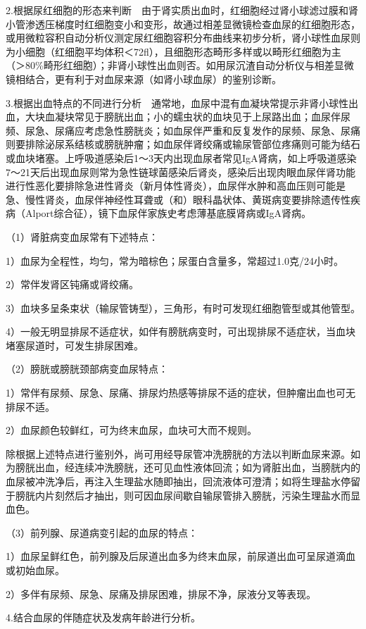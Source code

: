 2.根据尿红细胞的形态来判断　由于肾实质出血时，红细胞经过肾小球滤过膜和肾小管渗透压梯度时红细胞变小和变形，故通过相差显微镜检查血尿的红细胞形态，或用微粒容积自动分析仪测定尿红细胞容积分布曲线来初步分析，肾小球性血尿则为小细胞（红细胞平均体积＜72fl），且细胞形态畸形多样或以畸形红细胞为主（＞80\%畸形红细胞）；非肾小球性出血则否。如用尿沉渣自动分析仪与相差显微镜相结合，更有利于对血尿来源（如肾小球血尿）的鉴别诊断。

3.根据出血特点的不同进行分析　通常地，血尿中混有血凝块常提示非肾小球性出血，大块血凝块常见于膀胱出血；小的蠕虫状的血块见于上尿路出血；血尿伴尿频、尿急、尿痛应考虑急性膀胱炎；如血尿伴严重和反复发作的尿频、尿急、尿痛则要排除泌尿系结核或膀胱肿瘤；如血尿伴肾绞痛或输尿管部位疼痛则可能为结石或血块堵塞。上呼吸道感染后1～3天内出现血尿者常见IgA肾病，如上呼吸道感染7～21天后出现血尿则常为急性链球菌感染后肾炎，感染后出现肉眼血尿伴肾功能进行性恶化要排除急进性肾炎（新月体性肾炎），血尿伴水肿和高血压则可能是急、慢性肾炎，血尿伴神经性耳聋或（和）眼科晶状体、黄斑病变要排除遗传性疾病（Alport综合征），镜下血尿伴家族史考虑薄基底膜肾病或IgA肾病。

（1）肾脏病变血尿常有下述特点：

1）血尿为全程性，均匀，常为暗棕色；尿蛋白含量多，常超过1.0克/24小时。

2）常伴发肾区钝痛或肾绞痛。

3）血块多呈条束状（输尿管铸型），三角形，有时可发现红细胞管型或其他管型。

4）一般无明显排尿不适症状，如伴有膀胱病变时，可出现排尿不适症状，当血块堵塞尿道时，可发生排尿困难。

（2）膀胱或膀胱颈部病变血尿特点：

1）常伴有尿频、尿急、尿痛、排尿灼热感等排尿不适的症状，但肿瘤出血也可无排尿不适。

2）血尿颜色较鲜红，可为终末血尿，血块可大而不规则。

除根据上述特点进行鉴别外，尚可用经导尿管冲洗膀胱的方法以判断血尿来源。如为膀胱出血，经连续冲洗膀胱，还可见血性液体回流；如为肾脏出血，当膀胱内的血尿被冲洗净后，再注入生理盐水随即抽出，回流液体可澄清；如将生理盐水停留于膀胱内片刻然后才抽出，则可因血尿间歇自输尿管排入膀胱，污染生理盐水而显血色。

（3）前列腺、尿道病变引起的血尿的特点：

1）血尿呈鲜红色，前列腺及后尿道出血多为终末血尿，前尿道出血可呈尿道滴血或初始血尿。

2）多伴有尿频、尿急、尿痛及排尿困难，排尿不净，尿液分叉等表现。

4.结合血尿的伴随症状及发病年龄进行分析。

